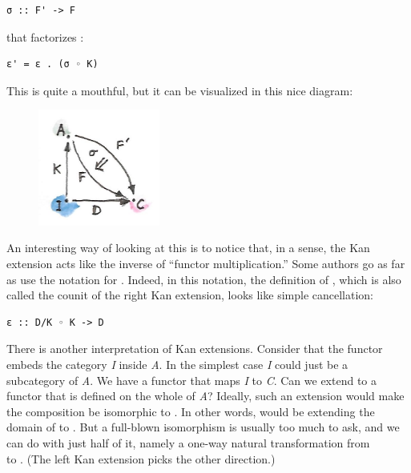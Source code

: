 \begin{Verbatim}[commandchars=\\\{\}]
σ :: F' -> F
\end{Verbatim}
that factorizes :

\begin{Verbatim}[commandchars=\\\{\}]
ε' = ε . (σ ◦ K)
\end{Verbatim}
This is quite a mouthful, but it can be visualized in this nice diagram:

\begin{figure}[H]
\centering
\includegraphics[width=40mm]{images/kan7.jpg}
\end{figure}

\noindent
An interesting way of looking at this is to notice that, in a sense, the
Kan extension acts like the inverse of ``functor multiplication.'' Some
authors go as far as use the notation  for .
Indeed, in this notation, the definition of , which is also
called the counit of the right Kan extension, looks like simple
cancellation:

\begin{Verbatim}[commandchars=\\\{\}]
ε :: D/K ◦ K -> D
\end{Verbatim}
There is another interpretation of Kan extensions. Consider that the
functor  embeds the category \emph{I} inside \emph{A}. In the
simplest case \emph{I} could just be a subcategory of \emph{A}. We have
a functor  that maps \emph{I} to \emph{C}. Can we extend
 to a functor  that is defined on the whole of
\emph{A}? Ideally, such an extension would make the composition
 be isomorphic to . In other words, 
would be extending the domain of  to . But a
full-blown isomorphism is usually too much to ask, and we can do with
just half of it, namely a one-way natural transformation  from\\
 to . (The left Kan extension picks the other
direction.)

